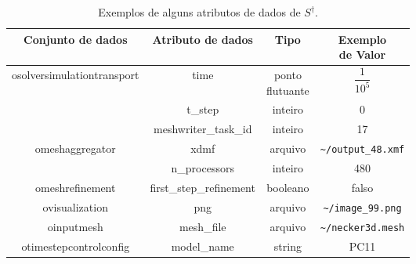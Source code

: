 \begin{table}[htb]
    \centering
    \begin{tabular}{c|c|c|c}
\textbf{Conjunto de dados}                  & \textbf{Atributo de dados} & \textbf{Tipo}   & \makecell{\textbf{Exemplo} \\ \textbf{de Valor}}             \\ \hline
\multirow{3}{*}{osolversimulationtransport} & time                       & \makecell{ponto \\ flutuante} & $\dfrac{1}{10^5}$                                  \\ \cline{2-4}
                                            & t\_step                    & inteiro         & 0                                      \\ \cline{2-4}
                                            & meshwriter\_task\_id       & inteiro         & 17                                     \\ \hline
\multirow{2}{*}{omeshaggregator}            & xdmf                       & arquivo         & \texttt{\textasciitilde/output\_48.xmf}             \\ \cline{2-4}
                                            & n\_processors              & inteiro         & 480                                    \\ \hline
omeshrefinement                             & first\_step\_refinement    & booleano        & falso                                  \\ \hline
ovisualization                              & png                        & arquivo         & \texttt{\textasciitilde/image\_99.png} \\ \hline
oinputmesh                                  & mesh\_file                 & arquivo         & \texttt{\textasciitilde/necker3d.mesh}               \\ \hline
otimestepcontrolconfig                      & model\_name                & string          & PC11                                  
    \end{tabular}
    \caption[Exemplos de alguns atributos de dados de \(S^{\dagger}\)]{Exemplos de alguns atributos de dados de \(S^{\dagger}\).}%
    \label{tab:experiments-data-attributes}
\end{table}



